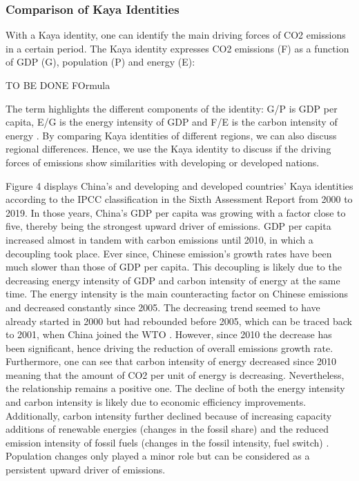 \documentclass[
  12pt,
]{article}
\numberwithin{equation}{section}
\numberwithin{table}{section}
\numberwithin{figure}{section}
\begin{document}
\hypertarget{comparison-of-kaya-identities}{%
\subsubsection{Comparison of Kaya
Identities}\label{comparison-of-kaya-identities}}

With a Kaya identity, one can identify the main driving forces of CO2
emissions in a certain period. The Kaya identity expresses CO2 emissions
(F) as a function of GDP (G), population (P) and energy (E):

TO BE DONE FOrmula

The term highlights the different components of the identity: G/P is GDP
per capita, E/G is the energy intensity of GDP and F/E is the carbon
intensity of energy \citep{Lamb2021}. By comparing Kaya identities of
different regions, we can also discuss regional differences. Hence, we
use the Kaya identity to discuss if the driving forces of emissions show
similarities with developing or developed nations.

Figure 4 displays China's and developing and developed countries' Kaya
identities according to the IPCC classification in the Sixth Assessment
Report from 2000 to 2019. In those years, China's GDP per capita was
growing with a factor close to five, thereby being the strongest upward
driver of emissions. GDP per capita increased almost in tandem with
carbon emissions until 2010, in which a decoupling took place. Ever
since, Chinese emission's growth rates have been much slower than those
of GDP per capita. This decoupling is likely due to the decreasing
energy intensity of GDP and carbon intensity of energy at the same time.
The energy intensity is the main counteracting factor on Chinese
emissions and decreased constantly since 2005. The decreasing trend
seemed to have already started in 2000 but had rebounded before 2005,
which can be traced back to 2001, when China joined the WTO
\citep{Zheng2020}. However, since 2010 the decrease has been
significant, hence driving the reduction of overall emissions growth
rate. Furthermore, one can see that carbon intensity of energy decreased
since 2010 meaning that the amount of CO2 per unit of energy is
decreasing. Nevertheless, the relationship remains a positive one. The
decline of both the energy intensity and carbon intensity is likely due
to economic efficiency improvements. Additionally, carbon intensity
further declined because of increasing capacity additions of renewable
energies (changes in the fossil share) and the reduced emission
intensity of fossil fuels (changes in the fossil intensity, fuel switch)
\citep{Zheng2020, Peters2017}. Population changes only played a minor
role but can be considered as a persistent upward driver of emissions.
\end{document}
